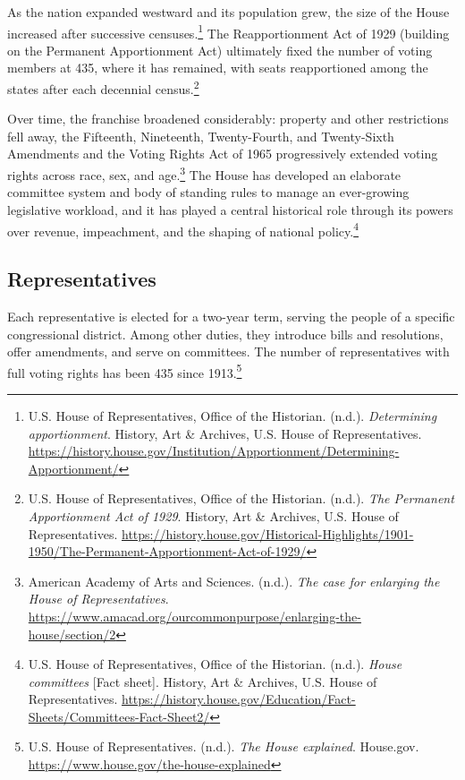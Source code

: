 As the nation expanded westward and its population grew, the size of the House increased after successive censuses.\footnote{U.S. House of Representatives, Office of the Historian. (n.d.). \emph{Determining apportionment}. History, Art \& Archives, U.S. House of Representatives. \url{https://history.house.gov/Institution/Apportionment/Determining-Apportionment/}} The Reapportionment Act of 1929 (building on the Permanent Apportionment Act) ultimately fixed the number of voting members at 435, where it has remained, with seats reapportioned among the states after each decennial census.\footnote{U.S. House of Representatives, Office of the Historian. (n.d.). \emph{The Permanent Apportionment Act of 1929}. History, Art \& Archives, U.S. House of Representatives. \url{https://history.house.gov/Historical-Highlights/1901-1950/The-Permanent-Apportionment-Act-of-1929/}}

Over time, the franchise broadened considerably: property and other restrictions fell away, the Fifteenth, Nineteenth, Twenty-Fourth, and Twenty-Sixth Amendments and the Voting Rights Act of 1965 progressively extended voting rights across race, sex, and age.\footnote{American Academy of Arts and Sciences. (n.d.). \emph{The case for enlarging the House of Representatives}. \url{https://www.amacad.org/ourcommonpurpose/enlarging-the-house/section/2}} The House has developed an elaborate committee system and body of standing rules to manage an ever-growing legislative workload, and it has played a central historical role through its powers over revenue, impeachment, and the shaping of national policy.\footnote{U.S. House of Representatives, Office of the Historian. (n.d.). \emph{House committees} [Fact sheet]. History, Art \& Archives, U.S. House of Representatives. \url{https://history.house.gov/Education/Fact-Sheets/Committees-Fact-Sheet2/}}

\subsection{Representatives}

Each representative is elected for a two-year term, serving the people of a specific congressional district. Among other duties, they introduce bills and resolutions, offer amendments, and serve on committees. The number of representatives with full voting rights has been 435 since 1913.\footnote{U.S. House of Representatives. (n.d.). \emph{The House explained}. House.gov. \url{https://www.house.gov/the-house-explained}}

